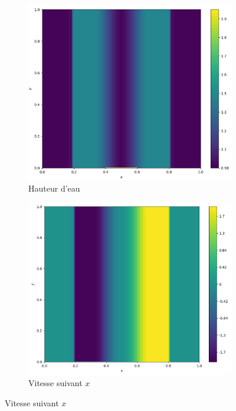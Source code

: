\documentclass[
	french,
	11pt, %
]{fphw}
\begin{document}
\begin{figure}[H]
	\centering
	\begin{subfigure}{0.32\textwidth}
		\centering
		\includegraphics[width=\textwidth,height=0.85\textwidth]{Rusa1h.png}
		\caption{Hauteur d'eau}
		\label{fig:Rusa1h}
	\end{subfigure}
	\begin{subfigure}{0.32\textwidth}
		\centering
		\includegraphics[width=\textwidth,height=0.85\textwidth]{Rusa1u.png}
		\caption{Vitesse suivant $x$}

\end{subfigure}
\end{figure}
\end{document}
